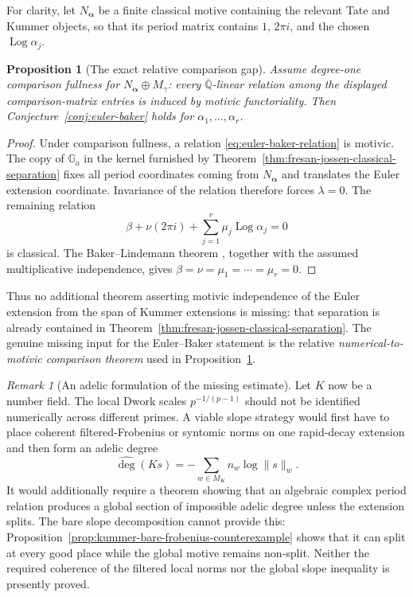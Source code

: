 \documentclass[11pt]{article}
\newtheorem{proposition}[theorem]{Proposition}
\theoremstyle{definition}
\theoremstyle{remark}
\newtheorem{remark}[theorem]{Remark}
\newcommand{\Qbar}{\overline{\mathbb Q}}
\newcommand{\Log}{\operatorname{Log}}
\begin{document}
For clarity, let $N_{\boldsymbol\alpha}$ be a finite classical motive
containing the relevant Tate and Kummer objects, so that its period matrix
contains $1$, $2\pi i$, and the chosen $\Log\alpha_j$.

\begin{proposition}[The exact relative comparison gap]
\label{prop:relative-fullness-implies-euler-baker}
Assume degree-one comparison fullness for
$N_{\boldsymbol\alpha}\oplus M_\gamma$: every $\Qbar$-linear relation among
the displayed comparison-matrix entries is induced by motivic
functoriality.  Then Conjecture~\ref{conj:euler-baker} holds for
$\alpha_1,\ldots,\alpha_r$.
\end{proposition}

\begin{proof}
Under comparison fullness, a relation
\eqref{eq:euler-baker-relation} is motivic.  The copy of $\mathbb G_a$ in
the kernel furnished by
Theorem~\ref{thm:fresan-jossen-classical-separation} fixes all period
coordinates coming from $N_{\boldsymbol\alpha}$ and translates the Euler
extension coordinate.  Invariance of the relation therefore forces
$\lambda=0$.  The remaining relation
\[
 \beta+\nu(2\pi i)+\sum_{j=1}^r\mu_j\Log\alpha_j=0
\]
is classical.  The Baker--Lindemann theorem \cite{Baker1975}, together with the assumed
multiplicative independence, gives
$\beta=\nu=\mu_1=\cdots=\mu_r=0$.
\end{proof}

Thus no additional theorem asserting motivic independence of the Euler
extension from the span of Kummer extensions is missing: that separation is
already contained in
Theorem~\ref{thm:fresan-jossen-classical-separation}.  The genuine missing
input for the Euler--Baker statement is the relative
\emph{numerical-to-motivic comparison theorem} used in
Proposition~\ref{prop:relative-fullness-implies-euler-baker}.

\begin{remark}[An adelic formulation of the missing estimate]
Let $K$ now be a number field.  The local Dwork scales
$p^{-1/(p-1)}$ should not be identified numerically across different
primes.  A viable slope strategy would first have to place coherent
filtered-Frobenius or syntomic norms on one rapid-decay extension and then
form an adelic degree
\[
 \widehat{\deg}(Ks)=-\sum_{w\in M_K}n_w\log\|s\|_w.
\]
It would additionally require a theorem showing that an algebraic complex
period relation produces a global section of impossible adelic degree
unless the extension splits.  The bare slope decomposition cannot provide
this: Proposition~\ref{prop:kummer-bare-frobenius-counterexample} shows
that it can split at every good place while the global motive remains
non-split.  Neither the required coherence of the filtered local norms nor
the global slope inequality is presently proved.
\end{remark}
\end{document}
